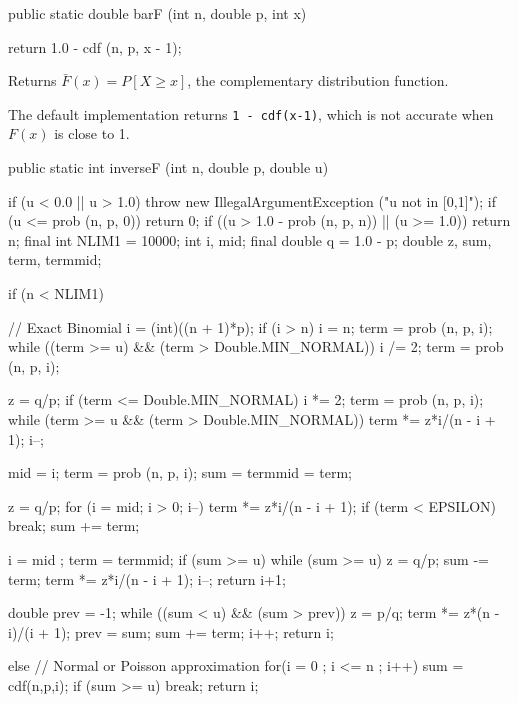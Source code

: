 \begin{code}

   public static double barF (int n, double p, int x)\begin{hide} {
      return 1.0 - cdf (n, p, x - 1);
   }\end{hide}
\end{code}
\begin{tabb}  Returns $\bar F(x) = P[X \ge x]$, the complementary
   distribution function.
\begin{detailed}%
   The default implementation returns \texttt{1 - cdf(x-1)}, which
   is not accurate when $F(x)$ is close to 1.
\end{detailed}%
\end{tabb}
\begin{code}

   public static int inverseF (int n, double p, double u) \begin{hide} {
      if (u < 0.0 || u > 1.0)
         throw new IllegalArgumentException ("u not in [0,1]");
      if (u <= prob (n, p, 0))
         return 0;
      if ((u > 1.0 - prob (n, p, n)) || (u >= 1.0))
         return n;
      final int NLIM1 = 10000;
      int i, mid;
      final double q = 1.0 - p;
      double z, sum, term, termmid;

      if (n < NLIM1) {               // Exact Binomial
         i = (int)((n + 1)*p);
         if (i > n)
            i = n;
         term = prob (n, p, i);
         while ((term >= u) && (term > Double.MIN_NORMAL)) {
            i /= 2;
            term = prob (n, p, i);
         }

         z = q/p;
         if (term <= Double.MIN_NORMAL) {
            i *= 2;
            term = prob (n, p, i);
            while (term >= u && (term > Double.MIN_NORMAL)) {
               term *= z*i/(n - i + 1);
               i--;
            }
         }

         mid = i;
         term = prob (n, p, i);
         sum = termmid = term;

         z = q/p;
         for (i = mid; i > 0; i--) {
            term *= z*i/(n - i + 1);
            if (term < EPSILON)
               break;
            sum += term;
         }

         i = mid ;
         term = termmid;
         if (sum >= u) {
             while (sum >= u){
                 z = q/p;
                 sum -= term;
                 term *= z*i/(n - i + 1);
                 i--;
             }
             return i+1;
         }

        double prev = -1;
        while ((sum < u) && (sum > prev)) {
            z = p/q;
            term *=  z*(n - i)/(i + 1);
            prev = sum;
            sum += term;
            i++;
         }
         return i;

      } else{  // Normal or Poisson  approximation
          for(i = 0 ; i <= n ; i++){
              sum = cdf(n,p,i);
              if (sum >= u)
                  break;
          }
          return i;
      }
    }\end{hide}
\end{code}
